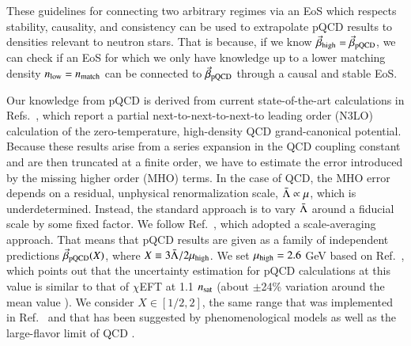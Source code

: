 \documentclass[aps,prd,nofootinbib,tightenlines,notitlepage,floatfix,superscriptaddress,showkeys,twocolumn]{revtex4-1}
\begin{document}
These guidelines for connecting two arbitrary regimes via an EoS which respects stability, causality, and consistency can be used to extrapolate pQCD results to densities relevant to neutron stars. That is because, if we know $\vec{\beta}_{\rm high} = \vec{\beta}_{\rm pQCD}$, we can check if an EoS for which we only have knowledge up to a lower matching density $n_{\rm low} = n_{\rm match}$ can be connected to $\vec{\beta}_{\rm pQCD}$ through a causal and stable EoS.   

Our knowledge from pQCD is derived from current state-of-the-art calculations in Refs.~\cite{Gorda:2018gpy,Gorda:2021gha}, which report a partial next-to-next-to-next-to leading order (N3LO) calculation of the zero-temperature, high-density QCD grand-canonical potential. Because these results arise from a series expansion in the QCD coupling constant and are then truncated at a finite order, we have to estimate the error introduced by the missing higher order (MHO) terms. In the case of QCD, the MHO error depends on a residual, unphysical renormalization scale, $\Bar{\Lambda} \propto \mu$, which is underdetermined. Instead, the standard approach is to vary $\Bar{\Lambda}$ around a fiducial scale by some fixed factor. We follow Ref.~\cite{Gorda:2022jvk}, which adopted a scale-averaging approach. That means that pQCD results are given as a family of independent predictions $\vec{\beta}_{\rm pQCD}(X)$, where $X \equiv 3\Bar{\Lambda}/2\mu_{\rm high}$. We set $\mu_{\rm high} = 2.6$ GeV based on Ref.~\cite{Fraga:2013qra}, which points out that the uncertainty estimation for pQCD calculations at this value is similar to that of $\chi$EFT at 1.1 $n_{\rm sat}$ (about $\pm$24\% variation around the mean value \cite{Gorda:2022jvk}). We consider $X \in [1/2,2]$, the same range that was implemented in Ref.~\cite{Gorda:2022jvk} and that has been suggested by phenomenological models \cite{Schneider:2003uz,Rebhan:2003wn,Cassing:2007nb,Gardim:2009mt} as well as the large-flavor limit of QCD \cite{Ipp:2003jy}.
\end{document}
